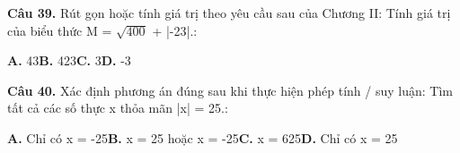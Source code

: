 \documentclass[11pt,a4paper]{article}
\begin{document}
\textbf{\color{primary} Câu 39.} Rút gọn hoặc tính giá trị theo yêu cầu sau của Chương II: Tính giá trị của biểu thức M = $\sqrt{400}$ + |-23|.:\par
\hspace*{1.5em}\textbf{A.} 43\quad\quad \textbf{B.} 423\quad\quad \textbf{C.} 3\quad\quad \textbf{D.} -3\par\vspace{2pt}
\textbf{\color{primary} Câu 40.} Xác định phương án đúng sau khi thực hiện phép tính / suy luận: Tìm tất cả các số thực x thỏa mãn |x| = 25.:\par
\hspace*{1.5em}\textbf{A.} Chỉ có x = -25\quad\quad \textbf{B.} x = 25 hoặc x = -25\quad\quad \textbf{C.} x = 625\quad\quad \textbf{D.} Chỉ có x = 25\par\vspace{2pt}
\end{document}
